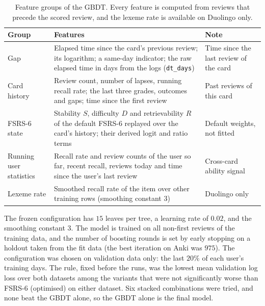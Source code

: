 \begin{table}[htbp]
  \centering
  \caption{Feature groups of the GBDT. Every feature is computed from reviews that precede the scored review,
    and the lexeme rate is available on Duolingo only.}
  \label{tab:gbdt-features}
  \begin{tabular}{@{}>{\raggedright\arraybackslash}p{3.4cm}>{\raggedright\arraybackslash}p{6.2cm}>{\raggedright\arraybackslash}p{4.2cm}@{}}
    \toprule
    \textbf{Group} & \textbf{Features} & \textbf{Note}\\
    \midrule
    Gap & Elapsed time since the card's previous review; its logarithm; a same-day indicator; the raw elapsed time in days from the logs (\texttt{dt\_days}) & Time since the last review of the card\\
    Card history & Review count, number of lapses, running recall rate; the last three grades, outcomes and gaps; time since the first review & Past reviews of this card\\
    FSRS-6 state & Stability $S$, difficulty $D$ and retrievability $R$ of the default FSRS-6 replayed over the card's history; their derived logit and ratio terms & Default weights, not fitted\\
    Running user statistics & Recall rate and review counts of the user so far, recent recall, reviews today and time since the user's last review & Cross-card ability signal\\
    Lexeme rate & Smoothed recall rate of the item over other training rows (smoothing constant $3$) & Duolingo only\\
    \bottomrule
  \end{tabular}
\end{table}

The frozen configuration has $15$ leaves per tree, a learning rate of $0.02$, and the smoothing constant $3$.
The model is trained on all non-first reviews of the training data, and the number of boosting rounds is
set by early stopping on a holdout taken from the fit data (the best iteration on Anki was $975$). The
configuration was chosen on validation data only: the last $20\%$ of each user's training days. The rule,
fixed before the runs, was the lowest mean validation log loss over both datasets among the variants that were not
significantly worse than FSRS-6 (optimised) on either dataset. Six stacked combinations were tried, and none
beat the GBDT alone, so the GBDT alone is the final model.


